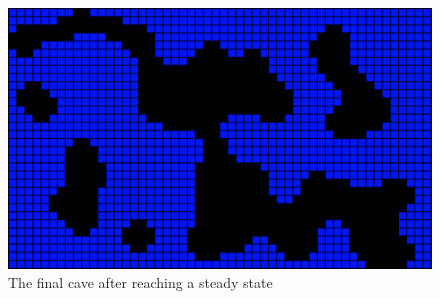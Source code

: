 \documentclass[a4paper, 12pt]{article}
\begin{document}
\begin{figure}[h]
	\centering
	\includegraphics[width=\textwidth]{final-cave.png}
	\caption{The final cave after reaching a steady state}
	\label{fig:finalCave}
\end{figure}

\clearpage

\printbibliography
\end{document}
